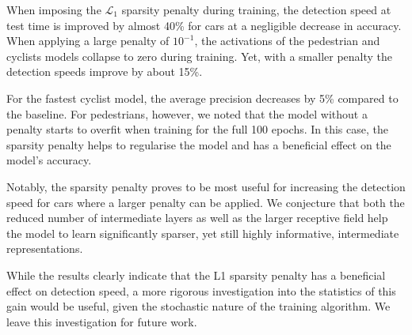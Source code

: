 \documentclass[letterpaper, 10 pt, conference]{tex_style/ieeeconf}
\begin{document}
When imposing the $\mathcal{L}_1$ sparsity penalty during training, the detection speed at test time is improved by almost 40\% for cars at a negligible decrease in accuracy.
When applying a large penalty of $10^{-1}$, the activations of the pedestrian and cyclists models collapse to zero during training.
Yet, with a smaller penalty the detection speeds improve by about 15\%.

For the fastest cyclist model, the average precision decreases by 5\% compared to the baseline.
For pedestrians, however, we noted that the model without a penalty starts to overfit when training for the full 100 epochs.
In this case, the sparsity penalty helps to regularise the model and has a beneficial effect on the model's accuracy.

Notably, the sparsity penalty proves to be most useful for increasing the detection speed for cars where a larger penalty can be applied.
We conjecture that both the reduced number of intermediate layers as well as the larger receptive field help the model to learn significantly sparser, yet still highly informative, intermediate representations.

While the results clearly indicate that the L1 sparsity penalty has a beneficial effect on detection speed, a more rigorous investigation into the statistics of this gain would be useful, given the stochastic nature of the training algorithm. We leave this investigation for future work.
\end{document}

